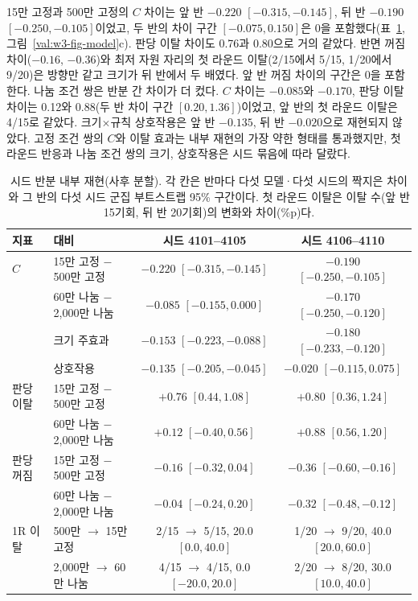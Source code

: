 15만 고정과 500만 고정의 $C$ 차이는 앞 반 $-0.220$ $[-0.315, -0.145]$, 뒤 반 $-0.190$ $[-0.250, -0.105]$이었고, 두 반의 차이 구간 $[-0.075, 0.150]$은 0을 포함했다(표~\ref{val:w3-tab-split}, 그림~\ref{val:w3-fig-model}c). 판당 이탈 차이도 0.76과 0.80으로 거의 같았다. 반면 꺼짐 차이($-0.16$, $-0.36$)와 최저 자원 자리의 첫 라운드 이탈(2/15에서 5/15, 1/20에서 9/20)은 방향만 같고 크기가 뒤 반에서 두 배였다. 앞 반 꺼짐 차이의 구간은 0을 포함한다. 나눔 조건 쌍은 반분 간 차이가 더 컸다. $C$ 차이는 $-0.085$와 $-0.170$, 판당 이탈 차이는 0.12와 0.88(두 반 차이 구간 $[0.20, 1.36]$)이었고, 앞 반의 첫 라운드 이탈은 4/15로 같았다. 크기$\times$규칙 상호작용은 앞 반 $-0.135$, 뒤 반 $-0.020$으로 재현되지 않았다. 고정 조건 쌍의 $C$와 이탈 효과는 내부 재현의 가장 약한 형태를 통과했지만, 첫 라운드 반응과 나눔 조건 쌍의 크기, 상호작용은 시드 묶음에 따라 달랐다.

\begin{table}[t]
\centering
\caption{시드 반분 내부 재현(사후 분할). 각 칸은 반마다 다섯 모델·다섯 시드의 짝지은 차이와 그 반의 다섯 시드 군집 부트스트랩 95\% 구간이다. 첫 라운드 이탈은 이탈 수(앞 반 15기회, 뒤 반 20기회)의 변화와 차이(\%p)다.}
\label{val:w3-tab-split}
\small
\setlength{\tabcolsep}{4pt}
\begin{tabular}{llcc}
\toprule
지표 & 대비 & 시드 4101--4105 & 시드 4106--4110 \\
\midrule
$C$ & 15만 고정 $-$ 500만 고정 & $-0.220$ $[-0.315, -0.145]$ & $-0.190$ $[-0.250, -0.105]$ \\
 & 60만 나눔 $-$ 2,000만 나눔 & $-0.085$ $[-0.155, 0.000]$ & $-0.170$ $[-0.250, -0.120]$ \\
 & 크기 주효과 & $-0.153$ $[-0.223, -0.088]$ & $-0.180$ $[-0.233, -0.120]$ \\
 & 상호작용 & $-0.135$ $[-0.205, -0.045]$ & $-0.020$ $[-0.115, 0.075]$ \\
판당 이탈 & 15만 고정 $-$ 500만 고정 & $+0.76$ $[0.44, 1.08]$ & $+0.80$ $[0.36, 1.24]$ \\
 & 60만 나눔 $-$ 2,000만 나눔 & $+0.12$ $[-0.40, 0.56]$ & $+0.88$ $[0.56, 1.20]$ \\
판당 꺼짐 & 15만 고정 $-$ 500만 고정 & $-0.16$ $[-0.32, 0.04]$ & $-0.36$ $[-0.60, -0.16]$ \\
 & 60만 나눔 $-$ 2,000만 나눔 & $-0.04$ $[-0.24, 0.20]$ & $-0.32$ $[-0.48, -0.12]$ \\
1R 이탈 & 500만 $\to$ 15만 고정 & 2/15 $\to$ 5/15, 20.0 $[0.0, 40.0]$ & 1/20 $\to$ 9/20, 40.0 $[20.0, 60.0]$ \\
 & 2,000만 $\to$ 60만 나눔 & 4/15 $\to$ 4/15, 0.0 $[-20.0, 20.0]$ & 2/20 $\to$ 8/20, 30.0 $[10.0, 40.0]$ \\
\bottomrule
\end{tabular}
\end{table}

